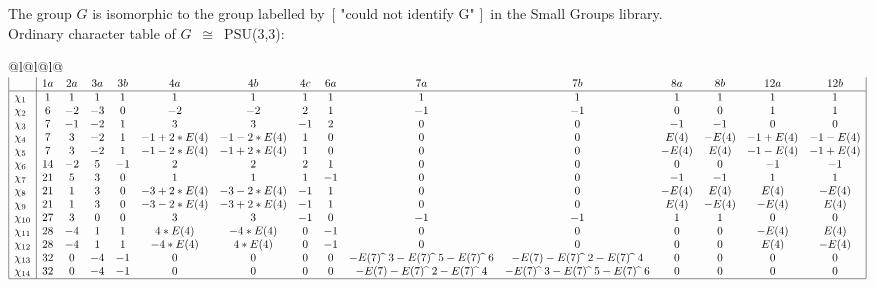 \documentclass[varwidth=\maxdimen,border=10]{standalone}
\begin{document}
The group $G$ is isomorphic to the group labelled by\ [ "could not identify G" ]\ in the Small Groups library.\\
Ordinary character table of $G$\ $\cong$\ PSU(3,3):\\
\begin{center}
\begin{tabular}{@{}l@{}l@{}l@{}}
\hline
\(\begin{array}{|l|cccccccccccccc|}
  & 1a & 2a & 3a & 3b & 4a & 4b & 4c & 6a & 7a & 7b & 8a & 8b & 12a & 12b\\ \hline
\chi_{1} & 1 & 1 & 1 & 1 & 1 & 1 & 1 & 1 & 1 & 1 & 1 & 1 & 1 & 1\\
\chi_{2} & 6 & -2 & -3 & 0 & -2 & -2 & 2 & 1 & -1 & -1 & 0 & 0 & 1 & 1\\
\chi_{3} & 7 & -1 & -2 & 1 & 3 & 3 & -1 & 2 & 0 & 0 & -1 & -1 & 0 & 0\\
\chi_{4} & 7 & 3 & -2 & 1 & -1+2*E(4) & -1-2*E(4) & 1 & 0 & 0 & 0 & E(4) & -E(4) & -1+E(4) & -1-E(4)\\
\chi_{5} & 7 & 3 & -2 & 1 & -1-2*E(4) & -1+2*E(4) & 1 & 0 & 0 & 0 & -E(4) & E(4) & -1-E(4) & -1+E(4)\\
\chi_{6} & 14 & -2 & 5 & -1 & 2 & 2 & 2 & 1 & 0 & 0 & 0 & 0 & -1 & -1\\
\chi_{7} & 21 & 5 & 3 & 0 & 1 & 1 & 1 & -1 & 0 & 0 & -1 & -1 & 1 & 1\\
\chi_{8} & 21 & 1 & 3 & 0 & -3+2*E(4) & -3-2*E(4) & -1 & 1 & 0 & 0 & -E(4) & E(4) & E(4) & -E(4)\\
\chi_{9} & 21 & 1 & 3 & 0 & -3-2*E(4) & -3+2*E(4) & -1 & 1 & 0 & 0 & E(4) & -E(4) & -E(4) & E(4)\\
\chi_{10} & 27 & 3 & 0 & 0 & 3 & 3 & -1 & 0 & -1 & -1 & 1 & 1 & 0 & 0\\
\chi_{11} & 28 & -4 & 1 & 1 & 4*E(4) & -4*E(4) & 0 & -1 & 0 & 0 & 0 & 0 & -E(4) & E(4)\\
\chi_{12} & 28 & -4 & 1 & 1 & -4*E(4) & 4*E(4) & 0 & -1 & 0 & 0 & 0 & 0 & E(4) & -E(4)\\
\chi_{13} & 32 & 0 & -4 & -1 & 0 & 0 & 0 & 0 & -E(7) \widehat{\ }\ {3}-E(7) \widehat{\ }\ {5}-E(7) \widehat{\ }\ {6} & -E(7)-E(7) \widehat{\ }\ {2}-E(7) \widehat{\ }\ {4} & 0 & 0 & 0 & 0\\
\chi_{14} & 32 & 0 & -4 & -1 & 0 & 0 & 0 & 0 & -E(7)-E(7) \widehat{\ }\ {2}-E(7) \widehat{\ }\ {4} & -E(7) \widehat{\ }\ {3}-E(7) \widehat{\ }\ {5}-E(7) \widehat{\ }\ {6} & 0 & 0 & 0 & 0\\
\hline
\end{array}\)\\
\end{tabular}
\end{center}
\end{document}
